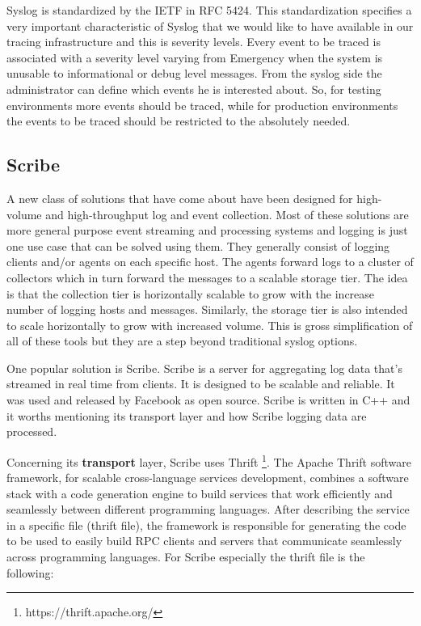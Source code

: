 Syslog is standardized by the IETF in RFC 5424. This standardization specifies a
very important characteristic of Syslog that we would like to have available in
our tracing infrastructure and this is severity levels. Every event to be traced
is associated with a severity level varying from Emergency when the system is
unusable to informational or debug level messages. From the syslog side the
administrator can define which events he is interested about. So, for testing
environments more events should be traced, while for production environments the
events to be traced should be restricted to the absolutely needed. 

\subsection{Scribe}
A new class of solutions that have come about have been designed for high-volume
and high-throughput log and event collection. Most of these solutions are more
general purpose event streaming and processing systems and logging is just one
use case that can be solved using them. They generally consist of logging
clients and/or agents on each specific host. The agents forward logs to a
cluster of collectors which in turn forward the messages to a scalable storage
tier. The idea is that the collection tier is horizontally scalable to grow with
the increase number of logging hosts and messages. Similarly, the storage tier
is also intended to scale horizontally to grow with increased volume. This is
gross simplification of all of these tools but they are a step beyond
traditional syslog options.

One popular solution is Scribe. Scribe is a server for aggregating log data
that's streamed in real time from clients. It is designed to be scalable and
reliable.  It was used and released by Facebook as open source. Scribe is
written in C++ and it worths mentioning its transport layer and how Scribe
logging data are processed.

Concerning its \textbf{transport} layer, Scribe uses Thrift
\footnote{https://thrift.apache.org/}. The Apache Thrift software framework, for
scalable cross-language services development, combines a software stack with a
code generation engine to build services that work efficiently and seamlessly
between different programming languages. After describing the service in a
specific file (thrift file), the framework is  responsible for generating the
code to be used to easily build RPC clients and servers that communicate
seamlessly across programming languages. For Scribe especially the thrift file
is the following:  

